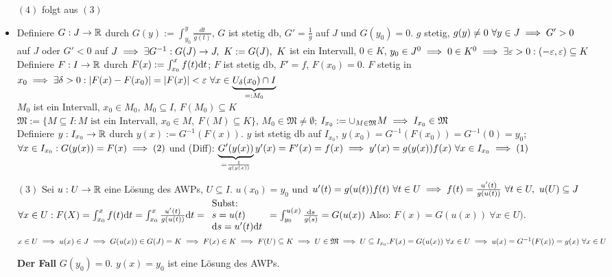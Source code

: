 \documentclass{article}
\begin{document}
\begin{beweis}
\begin{itemize}
\item[$(4)$] folgt aus $(3)$
\item Definiere $G:J\to \mathbb{R}$ durch $G(y):=\int_{y_0}^y \frac{dt}{g(t)}$, $G$ ist stetig db, $G'=\frac{1}{g}$ auf $J$ und $G(y_0)=0$. $g$ stetig, $g(y)\ne 0\ \forall y\in J \implies G'>0$ auf $J$ oder $G'<0$ auf $J \folgt \exists G^{-1}:G(J)\to J,\ K:=G(J),\ K$ ist ein Intervall, $0\in K$, $y_0 \in J^0 \implies 0\in K^0\implies \exists \varepsilon >0:(-\varepsilon,\varepsilon)\subseteq K$
Definiere $F:I\to\mathbb{R}$ durch $F(x):=\int_{x_0}^xf(t)\mathrm{d} t$; $F$ ist stetig db, $F'=f$, $F(x_0)=0$. $F$ stetig in $x_0\implies \exists \delta >0: |F(x)-F(x_0)|=|F(x)| < \varepsilon\ \forall x\in \underbrace{U_\delta (x_0) \cap I}_{=:M_0}$\\
$M_0$ ist ein Intervall, $x_0\in M_0$, $M_0 \subseteq I$, $F(M_0)\subseteq K$ \\
$\mathfrak{M}:=\{M\subseteq I : M \text{ ist ein Intervall, } x_0\in M,\ F(M)\subseteq K\}$, $M_0\in \mathfrak{M} \ne \emptyset$; $I_{x_0}:=\cup_{M\in \mathfrak{M}} M \implies I_{x_0} \in \mathfrak{M}$\\
Definiere $y:I_{x_0}\to\mathbb{R}$ durch $y(x):=G^{-1}(F(x))$. $y$ ist stetig db auf $I_{x_0}$, $y(x_0)=G^{-1}(F(x_0))=G^{-1}(0)=y_0$; $\forall x \in I_{x_0}: G(y(x))=F(x) \implies (2)$ und (Diff): $\underbrace{G'(y(x))}_{=\frac{1}{g(y(x))}}y'(x)=F'(x)=f(x)\implies y'(x)=g(y(x))f(x)\ \forall x\in I_{x_0} \implies (1)$
\item[$(3)$] Sei $u:U\to\mathbb{R}$ eine Lösung des AWPs, $U\subseteq I$. $u(x_0)=y_0$ und $u'(t)=g(u(t))f(t)\ \forall t\in U \implies f(t)=\frac{u'(t)}{g(u(t))}\ \forall t\in U,\ u(U)\subseteq J$\\
$\forall x\in U: F(X)=\int_{x_0}^x f(t)\mathrm{d} t = \int_{x_0}^x\frac{u'(t)}{g(u(t))}\mathrm{d} t=\begin{array}{l} \text{Subst:}\\s=u(t)\\\mathrm{d} s=u'(t)\mathrm{d} t\end{array}=\int_{y_0}^{u(x)}\frac{\mathrm{d} s}{g(s)}=G(u(x))$ Also: $F(x)=G(u(x))\ \forall x\in U)$.
$x \in U \implies u(x)\in J\implies G(u(x))\in G(J)=K\implies F(x)\in K\implies F(U)\subseteq K\implies U\in \mathfrak{M} \implies U\subseteq I_{x_0}.\\
F(x)=G(u(x))\ \forall x\in U \implies u(x)=G^{-1}(F(x))=y(x)\ \forall x\in U$

\textbf{Der Fall} $G(y_0) = 0$. $y(x) = y_0$ ist eine Lösung des AWPs.
\end{itemize}
\end{beweis}
\end{document}
